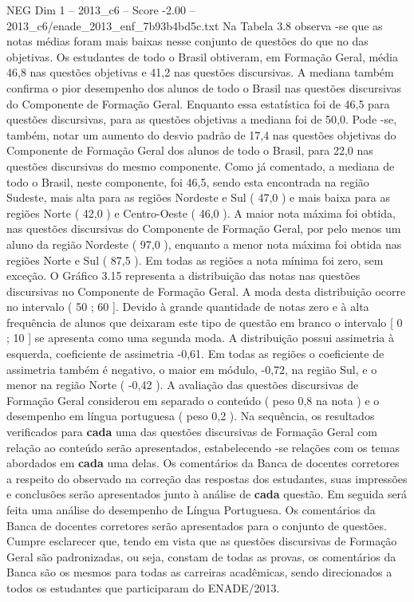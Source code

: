 \begin{textsample}{NEG Dim 1 – 2013\_c6 – Score -2.00 – 2013\_c6/enade\_2013\_enf\_7b93b4bd5c.txt}
Na Tabela 3.8 observa -se que as notas médias foram mais baixas nesse conjunto de questões do que no das objetivas.
Os estudantes de todo o Brasil obtiveram, em Formação Geral, média 46,8 nas questões objetivas e 41,2 nas questões discursivas.
A mediana também confirma o pior desempenho dos alunos de todo o Brasil nas questões discursivas do Componente de Formação Geral.
Enquanto essa estatística foi de 46,5 para questões discursivas, para as questões objetivas a mediana foi de 50,0.
Pode -se, também, notar um aumento do desvio padrão de 17,4 nas questões objetivas do Componente de Formação Geral dos alunos de todo o Brasil, para 22,0 nas questões discursivas do mesmo componente.
Como já comentado, a mediana de todo o Brasil, neste componente, foi 46,5, sendo esta encontrada na região Sudeste, mais alta para as regiões Nordeste e Sul ( 47,0 ) e mais baixa para as regiões Norte ( 42,0 ) e Centro-Oeste ( 46,0 ).
A maior nota máxima foi obtida, nas questões discursivas do Componente de Formação Geral, por pelo menos um aluno da região Nordeste ( 97,0 ), enquanto a menor nota máxima foi obtida nas regiões Norte e Sul ( 87,5 ).
Em todas as regiões a nota mínima foi zero, sem exceção.
O Gráfico 3.15 representa a distribuição das notas nas questões discursivas no Componente de Formação Geral.
A moda desta distribuição ocorre no intervalo ( 50 ; 60 ].
Devido à grande quantidade de notas zero e à alta frequência de alunos que deixaram este tipo de questão em branco o intervalo [ 0 ; 10 ] se apresenta como uma segunda moda.
A distribuição possui assimetria à esquerda, coeficiente de assimetria -0,61.
Em todas as regiões o coeficiente de assimetria também é negativo, o maior em módulo, -0,72, na região Sul, e o menor na região Norte ( -0,42 ).
A avaliação das questões discursivas de Formação Geral considerou em separado o conteúdo ( peso 0,8 na nota ) e o desempenho em língua portuguesa ( peso 0,2 ).
Na sequência, os resultados verificados para \textbf{cada} uma das questões discursivas de Formação Geral com relação ao conteúdo serão apresentados, estabelecendo -se relações com os temas abordados em \textbf{cada} uma delas.
Os comentários da Banca de docentes corretores a respeito do observado na correção das respostas dos estudantes, suas impressões e conclusões serão apresentados junto à análise de \textbf{cada} questão.
Em seguida será feita uma análise do desempenho de Língua Portuguesa.
Os comentários da Banca de docentes corretores serão apresentados para o conjunto de questões.
Cumpre esclarecer que, tendo em vista que as questões discursivas de Formação Geral são padronizadas, ou seja, constam de todas as provas, os comentários da Banca são os mesmos para todas as carreiras acadêmicas, sendo direcionados a todos os estudantes que participaram do ENADE/2013.

\end{textsample}
